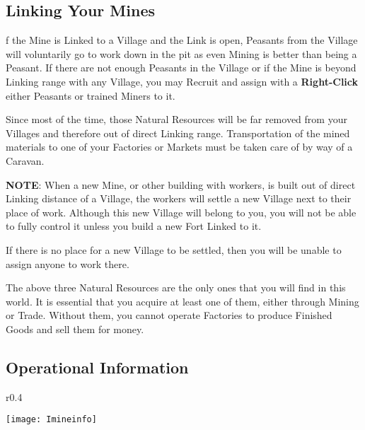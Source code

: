 \subsection{\textsf{Linking Your Mines}}


f the Mine is Linked to a Village and the Link is open, Peasants from the Village will voluntarily go to work down in the pit as even Mining is better than being a Peasant. If there are not enough Peasants in the Village or if the Mine is beyond Linking range with any Village, you may Recruit and assign with a \textbf{Right-Click} either Peasants or trained Miners to it.

Since most of the time, those Natural Resources will be far removed from your Villages and therefore out of direct Linking range. Transportation of the mined materials to one of your Factories or Markets must be taken care of by way of a Caravan.

\textbf{NOTE}: When a new Mine, or other building with workers, is built out of direct Linking distance of a Village, the workers will settle a new Village next to their place of work. Although this new Village will belong to you, you will not be able to fully control it unless you build a new Fort Linked to it.

If there is no place for a new Village to be settled, then you will be unable to assign anyone to work there.


The above three Natural Resources are the only ones that you will find in this world. It is essential that you acquire at least one of them, either through Mining or Trade. Without them, you cannot operate Factories to produce Finished Goods and sell them for money.

\subsection{\textsf{Operational Information}}


\begin{wrapfigure}{r}{0.4\textwidth}
    \vspace{-20pt}
    \begin{center}
        \texttt{[image: Imineinfo]} %
    \end{center}
    \vspace{-50pt}
\end{wrapfigure}

